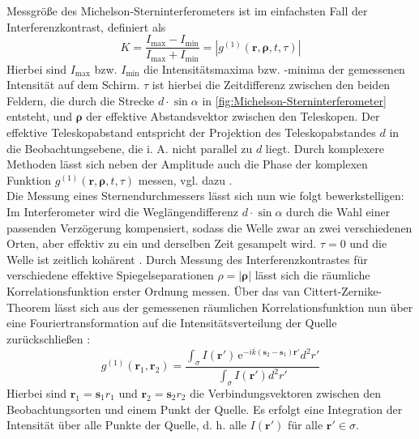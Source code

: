 Messgröße des Michelson-Sterninterferometers ist im einfachsten Fall der Interferenzkontrast, definiert als \cite{foellmiIntensityInterferometrySecondorder2009}
\begin{equation}
    K = \frac{I_{\mathrm{max}}-I_{\mathrm{min}}}{I_{\mathrm{max}}+I_{\mathrm{min}}}=\left|g^{(1)}(\mathbf{r}, \bm{\rho}, t, \tau)\right|
\end{equation} 
Hierbei sind $I_{\mathrm{max}}$ bzw. $I_{\mathrm{min}}$ die Intensitätsmaxima bzw. -minima der gemessenen Intensität auf dem Schirm. 
$\tau$ ist hierbei die Zeitdifferenz zwischen den beiden Feldern, die durch die Strecke $d\cdot\sin \alpha$ in \autoref{fig:Michelson-Sterninterferometer} entsteht, und $\bm{\rho}$ der effektive Abstandsvektor zwischen den Teleskopen. 
Der effektive Teleskopabstand entspricht der Projektion des Teleskopabstandes $d$ in die Beobachtungsebene, die i. A. nicht parallel zu $d$ liegt. 
Durch komplexere Methoden lässt sich neben der Amplitude auch die Phase der komplexen Funktion $g^{(1)}(\mathbf{r}, \bm{\rho}, t, \tau)$ messen, vgl. dazu \cite[Kap. 4.3]{mandelOpticalCoherenceQuantum1995}. \\
Die Messung eines Sternendurchmessers lässt sich nun wie folgt bewerkstelligen:
Im Interferometer wird die Weglängendifferenz $d \cdot\sin \alpha$ durch die Wahl einer passenden Verzögerung kompensiert, sodass die Welle zwar an zwei verschiedenen Orten, aber effektiv zu ein und derselben Zeit gesampelt wird. 
$\tau=0$ und die Welle ist zeitlich kohärent \cite{foellmiIntensityInterferometrySecondorder2009}. 
Durch Messung des Interferenzkontrastes für verschiedene effektive Spiegelseparationen $\rho=|\bm{\rho}|$ lässt sich die räumliche Korrelationsfunktion erster Ordnung messen. 
Über das van Cittert-Zernike-Theorem lässt sich aus der gemessenen räumlichen Korrelationsfunktion nun über eine Fouriertransformation auf die Intensitätsverteilung der Quelle zurückschließen \cite[Gl. 4.4-40]{mandelOpticalCoherenceQuantum1995}:
\begin{equation}
    g^{(1)}(\bm{r}_1, \bm{r}_2) = \frac{\int_\sigma I(\bm{r}') \,\mathrm{e}^{-i\overline{k}\left(\bm{s}_2 - \bm{s}_1\right) \bm{r}'} d^2r'}{\int_\sigma I \left(\bm{r}'\right) d^2 r'}
    \label{eq:van Cittert-Zernike}
\end{equation}
Hierbei sind $\bm{r}_1=\bm{s}_1 r_1$ und $\bm{r}_2=\bm{s}_2 r_2$ die Verbindungsvektoren zwischen den Beobachtungsorten und einem Punkt der Quelle. 
Es erfolgt eine Integration der Intensität über alle Punkte der Quelle, d. h. alle $I\left(\bm{r}'\right)$ für alle $\bm{r}'\in \sigma$. 
